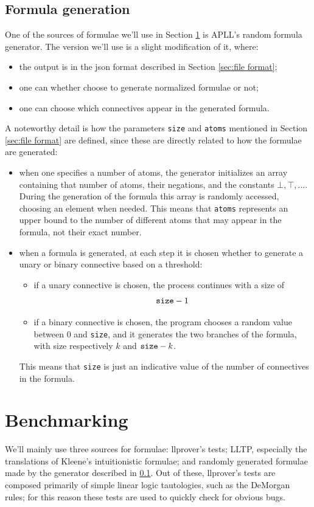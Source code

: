 \subsection{Formula generation}\label{sec:formula generator}
One of the sources of formulae we'll use in Section \ref{sec:benchmarking} is APLL's random formula generator.
The version we'll use is a slight modification of it, where:
\begin{itemize}
	\item the output is in the json format described in Section \ref{sec:file format};
	\item one can whether choose to generate normalized formulae or not;
	\item one can choose which connectives appear in the generated formula.
\end{itemize}
A noteworthy detail is how the parameters \texttt{size} and \texttt{atoms} mentioned in Section \ref{sec:file format} are defined, since these are directly related to how the formulae are generated:
\begin{itemize}
	\item when one specifies a number of atoms, the generator initializes an array containing that number of atoms, their negations, and the constants $\bot, \top, \dots$.
		During the generation of the formula this array is randomly accessed, choosing an element when needed.
		This means that \texttt{atoms} represents an upper bound to the number of different atoms that may appear in the formula, not their exact number.
	\item when a formula is generated, at each step it is chosen whether to generate a unary or binary connective based on a threshold:
		\begin{itemize}
			\item if a unary connective is chosen, the process continues with a size of 
				$$\text{\texttt{size}} - 1$$
			\item if a binary connective is chosen, the program chooses a random value between 0 and \texttt{size}, and it generates the two branches of the formula, with size respectively $k$ and $\text{\texttt{size}} - k$.
		\end{itemize}
		This means that \texttt{size} is just an indicative value of the number of connectives in the formula.
\end{itemize}

\section{Benchmarking}\label{sec:benchmarking}
We'll mainly use three sources for formulae: llprover's tests; LLTP, especially the translations of Kleene's intuitionistic formulae; and randomly generated formulae made by the generator described in \ref{sec:formula generator}.
Out of these, llprover's tests are composed primarily of simple linear logic tautologies, such as the DeMorgan rules; for this reason these tests are used to quickly check for obvious bugs.

